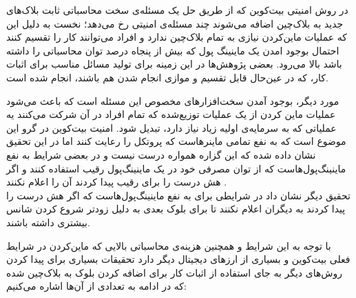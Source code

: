 در روش امنیتی بیت‌کوین که از طریق حل یک مسئله‌ی سخت محاسباتی ثابت بلاک‌های جدید به بلاک‌چین اضافه می‌شوند چند مسئله‌ی امنیتی رخ می‌دهد؛ نخست به دلیل این که عملیات ماین‌کردن نیازی به تمام بلاک‌چین ندارد و افراد می‌توانند کار را تقسیم کنند احتمال بوجود امدن یک ماینینگ پول که بیش از پنجاه‌ درصد توان محاسباتی را داشته باشد بالا می‌رود. بعضی پژوهش‌ها در این زمینه برای تولید مسائل مناسب برای اثبات کار، که در عین‌حال قابل تقسیم و موازی انجام شدن هم باشند، انجام شده است. 
\par
مورد‌ دیگر، بوجود آمدن سخت‌افزارهای مخصوص این مسئله‌ است که باعث می‌شود عملیات ماین کردن از یک عملیات توزیع‌شده که تمام افراد در آن شرکت می‌کنند یه عملیاتی که به سرمایه‌ی اولیه زیاد نیاز دارد، تبدیل شود. 
امنیت بیت‌کوین در گرو این موضوع است که به نفع تمامی ماینرهاست که پروتکل را رعایت کنند اما در این تحقیق
\cite{ResearchP}
 نشان داده شده که این گزاره همواره درست نیست و در بعضی شرایط به نفع ماینینگ‌پول‌هاست که از توان مصرفی خود در یک ماینینگ‌پول رقیب استفاده‌ کنند و اگر هش درست را برای رقیب پیدا کردند آن را اعلام نکنند
\cite{LongestChain}
. 
\\
تحقیق دیگر 
\cite{Majority}
نشان داد در شرایطی برای به نفع ماینینگ‌پول‌هاست که اگر هش درست را پیدا کردند به دیگران اعلام نکنند تا برای بلوک بعدی به دلیل زودتر شروع کردن شانس بیشتری داشته باشند. 
\par
با توجه به این شرایط و همچنین هزینه‌ی محاسباتی بالایی که ماین‌کردن در شرایط فعلی بیت‌کوین و بسیاری از ارزهای دیجیتال دیگر دارد تحقیقات بسیاری برای پیدا کردن روش‌های دیگر به جای استفاده از اثبات کار برای اضافه کردن بلوک به بلاک‌چین شده که در ادامه به تعدادی از آن‌ها اشاره می‌کنیم:
\\
